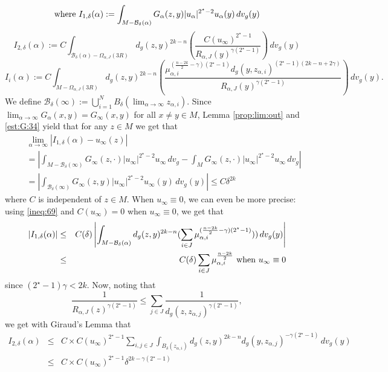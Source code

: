 \documentclass[reqno]{amsart}
\def \crit {2^\star}
\def \ua {u_\alpha}
\def \mai {\mu_{\alpha,i}}
\def \zai {z_{\alpha,i}}
\def \zaj {z_{\alpha,j}}
\begin{document}
$$\hbox{where }I_{1,\delta}(\alpha):= \int_{M-{\mathcal B}_\delta(\alpha)} G_\alpha(z,y)|\ua|^{\crit-2}\ua(y)\, dv_g(y) $$
$$I_{2,\delta}(\alpha):=C\int_{{\mathcal B}_\delta(\alpha)-\Omega_{\alpha, J}(3R)}d_g(z,y)^{2k-n}\left(\frac{C( u_\infty )^{\crit-1} }{R_{\alpha, J}(y)^{\gamma(\crit-1)}}\right)\, dv_g(y)$$
$$I_i(\alpha):=C\int_{M-\Omega_{\alpha, J}(3R)}d_g(z,y)^{2k-n}\left(\frac{\mai^{(\frac{n-2k}{2}-\gamma )(\crit-1)}d_g(y,\zai)^{(\crit-1)(2k-n+2\gamma)}}{R_{\alpha, J}(y)^{\gamma(\crit-1)}}\right)\, dv_g(y).$$
We define ${\mathcal B}_\delta(\infty):=\bigcup_{i=1}^NB_\delta(\lim_{\alpha\to \infty}\zai)$. Since $\lim_{\alpha\to\infty}G_\alpha(x,y)=G_\infty(x,y)$ for all $x\neq y\in M$,  Lemma \ref{prop:lim:out} and \eqref{est:G:34} yield that for any $z\in M$ we get that
\begin{eqnarray}
&& \lim_{\alpha\to \infty}\left|I_{1,\delta}(\alpha)-u_\infty(z)\right|\nonumber\\
&&= \left|\int_{M-{\mathcal B}_\delta(\infty)} G_\infty(z,\cdot)|u_\infty|^{\crit-2}u_\infty\, dv_g-\int_{M} G_\infty(z,\cdot)|u_\infty|^{\crit-2}u_\infty\, dv_g\right|\nonumber\\
&&=\left|\int_{{\mathcal B}_\delta(\infty)} G_\infty(z,y)|u_\infty|^{\crit-2}u_\infty(y)\, dv_g(y)\right|\leq C\delta^{2k}\label{ineq:345}
\end{eqnarray}
where $C$ is independent of $z\in M$. When $u_\infty\equiv 0$, we can even be more precise: using \eqref{ineq:69} and $C(u_\infty)=0$ when $u_\infty\equiv 0$, we get that
\begin{eqnarray}
\left|I_{1,\delta}(\alpha)\right|&\leq&  C(\delta)\left|\int_{M-{\mathcal B}_\delta(\alpha)} d_g(z,y)^{2k-n}( \sum_{i\in J}\mai^{(\frac{n-2k}{2}-\gamma )(\crit-1)} ))\, dv_g(y)\right|\nonumber\\
&\leq& C(\delta) \sum_{i\in J}\mai^{\frac{n-2k}{2}}\hbox{ when }u_\infty\equiv 0\label{ineq:87}
\end{eqnarray}
since $(\crit-1)\gamma<2k$. Now, noting that 
\begin{equation}\label{ineq:R:debut}
\frac{1}{R_{\alpha, J}(z)^{\gamma(\crit-1)}}\leq \sum_{j\in J}\frac{1}{d_g(z,\zaj)^{\gamma(\crit-1)}},
\end{equation}
we get with Giraud's Lemma that
\begin{eqnarray}
I_{2,\delta}(\alpha)&\leq &C\times C( u_\infty )^{\crit-1}\sum_{i,j\in J}\int_{B_\delta(\zai) }d_g(z,y)^{2k-n}d_g(y,\zaj)^{-\gamma(\crit-1)}\, dv_g(y)\nonumber\\
&\leq & C\times C( u_\infty )^{\crit-1}  \delta^{2k-\gamma(\crit-1)}\label{ineq:456}
\end{eqnarray}
\end{document}

